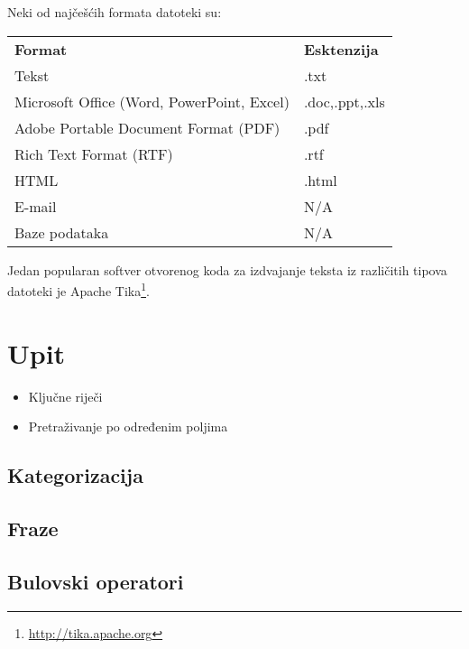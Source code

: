 \documentclass[11pt]{scrreprt}
\begin{document}
Neki od najčešćih formata datoteki su:

\begin{center}
  \begin{tabular}{ll}
    \textbf{Format}                            & \textbf{Esktenzija} \\
    Tekst                                      & .txt                \\
    Microsoft Office (Word, PowerPoint, Excel) & .doc,.ppt,.xls      \\
    Adobe Portable Document Format (PDF)       & .pdf                \\
    Rich Text Format (RTF)                     & .rtf                \\
    HTML                                       & .html               \\
    E-mail                                     & N/A                 \\
    Baze podataka                              & N/A                 \\
  \end{tabular}
\end{center}

Jedan popularan softver otvorenog koda za izdvajanje teksta iz različitih tipova datoteki je Apache Tika\footnote{\url{http://tika.apache.org}}.

\section{Upit}

\begin{itemize}
  \item{Ključne riječi}
  \item{Pretraživanje po određenim poljima}
\end{itemize}

\subsection{Kategorizacija}

\subsection{Fraze}

\subsection{Bulovski operatori}
\end{document}
